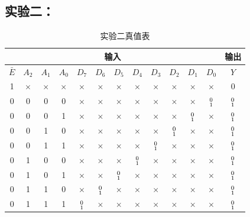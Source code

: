 \documentclass[a4paper,11pt,UTF8]{ctexart}
\begin{document}
 \subsection{实验二：\expb}
 \begin{table}[H]
  \centering
  \begin{tabular}{|cccccccccccc|c|}\hline
   \multicolumn{12}{|c|}{输入}  &输出
   \\\hline
   $\bar{E}$ &$A_2$ &$A_1$ &$A_0$ &$D_7$ &
   $D_6$ &$D_5$ &$D_4$ &$D_3$ &$D_2$ &$D_1$ &$D_0$ &$Y$
   \\\hline
   1 &$\times$ &$\times$ &$\times$	&$\times$ &$\times$ &$\times$ &$\times$ &$\times$ &$\times$ &$\times$ &$\times$ &0	\\
   0 &0 &0 &0 &$\times$ &$\times$ &$\times$ &$\times$ &$\times$ &$\times$ &$\times$ &$\smqty{0\\1}$ &$\smqty{0\\1}$	\\
   0 &0 &0 &1 &$\times$ &$\times$ &$\times$ &$\times$ &$\times$ &$\times$ &$\smqty{0\\1}$ &$\times$ &$\smqty{0\\1}$	\\
   0 &0 &1 &0 &$\times$ &$\times$ &$\times$ &$\times$ &$\times$ &$\smqty{0\\1}$ &$\times$ &$\times$ &$\smqty{0\\1}$	\\
   0 &0 &1 &1 &$\times$ &$\times$ &$\times$ &$\times$ &$\smqty{0\\1}$	&$\times$ &$\times$ &$\times$ &$\smqty{0\\1}$	\\
   0 &1 &0 &0 &$\times$ &$\times$ &$\times$ &$\smqty{0\\1}$ &$\times$ &$\times$ &$\times$ &$\times$ &$\smqty{0\\1}$  \\
   0 &1 &0 &1 &$\times$ &$\times$ &$\smqty{0\\1}$ &$\times$ &$\times$ &$\times$ &$\times$ &$\times$ &$\smqty{0\\1}$  \\
   0 &1 &1 &0 &$\times$ &$\smqty{0\\1}$ &$\times$ &$\times$ &$\times$ &$\times$ &$\times$ &$\times$ &$\smqty{0\\1}$  \\
   0 &1 &1 &1 &$\smqty{0\\1}$ &$\times$ &$\times$ &$\times$ &$\times$ &$\times$ &$\times$ &$\times$ &$\smqty{0\\1}$  
   \\\hline
  \end{tabular}
  \caption{实验二真值表}
  \label{tab:Exp02}
 \end{table}
  
\end{document}
